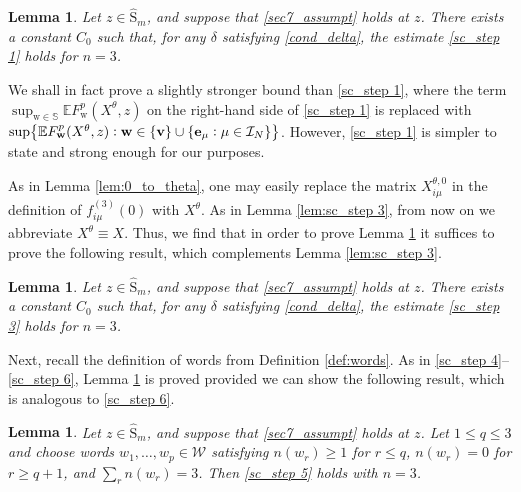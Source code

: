 \documentclass[11pt]{article} %
\numberwithin{equation}{section}
\numberwithin{figure}{section}
\theoremstyle{plain} %
\newtheorem{lemma}[theorem]{Lemma}
\theoremstyle{definition} %
\newcommand{\f}[1]{\boldsymbol{\mathrm{#1}}} %
\newcommand{\bb}{\mathbb} %
\renewcommand{\cal}{\mathcal}
\newcommand{\wh}{\widehat}
\newcommand{\E}{\mathbb{E}}
\newcommand{\col}{\mathrel{\vcenter{\baselineskip0.75ex \lineskiplimit0pt \hbox{.}\hbox{.}}}}
\renewcommand{\leq}{\leqslant}
\renewcommand{\geq}{\geqslant}
\newcommand{\hb}[1]{\bigl\{{#1}\bigr\}}
\begin{document}
\begin{lemma} \label{lem:71}
Let $z \in \wh {\f S}_m$, and suppose that \eqref{sec7_assumpt} holds at $z$. There exists a constant $C_0$ such that, for any $\delta$ satisfying \eqref{cond_delta}, the estimate \eqref{sc_step 1} holds for $n = 3$.
\end{lemma}


We shall in fact prove a slightly stronger bound than \eqref{sc_step 1}, where the term $\sup_{\f w \in \bb S} \E F_{\f w}^p(X^\theta, z)$ on the right-hand side of \eqref{sc_step 1} is replaced with $\sup \hb{\E F_{\f w}^p(X^\theta, z)\col \f w \in \{\f v\} \cup \{\f e_\mu \col \mu \in \cal I_N\}}$. However, \eqref{sc_step 1} is simpler to state and strong enough for our purposes.


As in Lemma \ref{lem:0_to_theta}, one may easily replace the matrix $X^{\theta,0}_{i \mu}$ in the definition of $f^{(3)}_{i \mu}(0)$ with $X^\theta$. As in Lemma \ref{lem:sc_step 3}, from now on we abbreviate $X^\theta \equiv X$. Thus, we find that in order to prove Lemma \ref{lem:71} it suffices to prove the following result, which complements Lemma \ref{lem:sc_step 3}.

\begin{lemma} \label{lem:73}
Let $z \in \wh {\f S}_m$, and suppose that \eqref{sec7_assumpt} holds at $z$. There exists a constant $C_0$ such that, for any $\delta$ satisfying \eqref{cond_delta}, the estimate \eqref{sc_step 3} holds for $n = 3$.
\end{lemma}

Next, recall the definition of words from Definition \ref{def:words}. As in \eqref{sc_step 4}--\eqref{sc_step 6}, Lemma \ref{lem:73} is proved provided we can show the following result, which is analogous to \eqref{sc_step 6}.

\begin{lemma} \label{lem:76}
Let $z \in \wh {\f S}_m$, and suppose that \eqref{sec7_assumpt} holds at $z$.
Let $1 \leq q \leq 3$ and choose words $w_1, \dots, w_p \in \cal W$ satisfying $n(w_r) \geq 1$ for $r \leq q$, $n(w_r) = 0$ for  $r \geq q + 1$, and $\sum_r n(w_r) = 3$.
Then \eqref{sc_step 5} holds with $n = 3$.
\end{lemma}
\end{document}
